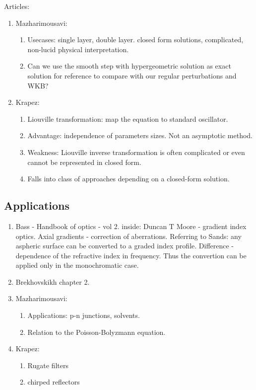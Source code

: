 \documentclass[twocolumn,secnumarabic,amssymb, nobibnotes, aps, prd]{revtex4-1}
\begin{document}
Articles:
\begin{enumerate}
\item Mazharimousavi: 
\begin{enumerate}
\item Usecases: single layer, double layer. closed form solutions, complicated, non-lucid physical interpretation. 
\item Can we use the smooth step with hypergeometric solution as exact solution for reference to compare with our regular perturbations and
 WKB?
\end{enumerate} 
\item Krapez: 
\begin{enumerate}
\item Liouville transformation: map the equation to standard oscillator. 
\item Advantage: independence of parameters sizes. Not an asymptotic method.
\item Weakness: Liouville inverse transformation is often complicated or even cannot be represented  in closed form.
\item Falls into class of approaches depending on a closed-form solution.  
\end{enumerate}
\end{enumerate} 


\subsection{Applications}
\begin{enumerate}
\item Bass - Handbook of optics - vol 2. inside: Duncan T Moore - gradient index optics. Axial gradients - correction of aberrations. Referring to Sands: any aspheric surface can be converted to a graded index profile. Difference - dependence of the refractive index in frequency. Thus the convertion can be  applied only in the monochromatic case.\\
\item Brekhovskikh \cite{Brekhovskikh1960} chapter 2.
\item Mazharimousavi: 
\begin{enumerate}
\item Applications: p-n junctions, solvents. 
\item Relation to the Poisson-Bolyzmann equation.
\end{enumerate}
\item Krapez:
\begin{enumerate}
\item Rugate filters
\item chirped reflectors
\end{enumerate}

\end{enumerate}
\end{document}
